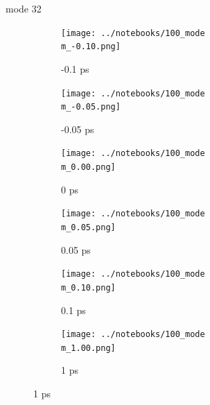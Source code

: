 \documentclass{beamer}
\newcommand\w{0.32}
\begin{document}
\renewcommand\m{32}
\begin{frame}{mode \m}
	\begin{figure}
		\centering
		\begin{subfigure}[b]{\w\textwidth}
			\centering
			\texttt{[image: ../notebooks/100\_mode\\m\_-0.10.png]}
			\caption{-0.1 ps}
		\end{subfigure}
		\begin{subfigure}[b]{\w\textwidth}
			\centering
			\texttt{[image: ../notebooks/100\_mode\\m\_-0.05.png]}
			\caption{-0.05 ps}
		\end{subfigure}
		\begin{subfigure}[b]{\w\textwidth}
			\centering
			\texttt{[image: ../notebooks/100\_mode\\m\_0.00.png]}
			\caption{0 ps}
		\end{subfigure}
		\begin{subfigure}[b]{\w\textwidth}
			\centering
			\texttt{[image: ../notebooks/100\_mode\\m\_0.05.png]}
			\caption{0.05 ps}
		\end{subfigure}
		\begin{subfigure}[b]{\w\textwidth}
			\centering
			\texttt{[image: ../notebooks/100\_mode\\m\_0.10.png]}
			\caption{0.1 ps}
		\end{subfigure}
		\begin{subfigure}[b]{\w\textwidth}
			\centering
			\texttt{[image: ../notebooks/100\_mode\\m\_1.00.png]}
			\caption{1 ps}
		\end{subfigure}
	\end{figure}
\end{frame}
\end{document}
